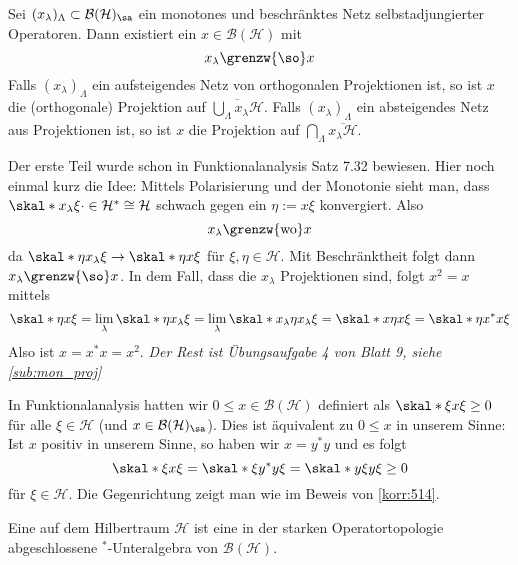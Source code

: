\begin{satz}[label=satz:62,{name=[monotone Netze selbstadjungierter Operatoren]}]
	Sei $(x_\lambda)_\Lambda \subset \mathcal{B}(\mathcal{H})_\sa$ ein monotones und beschränktes Netz selbstadjungierter Operatoren.
	Dann existiert ein $x \in \mathcal{B}(\mathcal{H})$ mit 
	\[
		x_\lambda \grenzw{\so} x
	\]
	Falls $(x_\lambda)_\Lambda$ ein aufsteigendes Netz von orthogonalen Projektionen ist, so ist $x$ die (orthogonale) Projektion auf $\overline{\bigcup_{\Lambda} x_\lambda \mathcal{H}}$.
	Falls $(x_\lambda)_\Lambda$ ein absteigendes Netz aus Projektionen ist, so ist $x$ die Projektion auf $\bigcap_\Lambda\overline{x_\lambda \mathcal{H}}$.
\end{satz}
\begin{beweis}
	Der erste Teil wurde schon in Funktionalanalysis Satz 7.32 bewiesen. 
	Hier noch einmal kurz die Idee: 
	Mittels Polarisierung und der Monotonie sieht man, dass $\skal*{x_\lambda \xi}{\cdot} \in \mathcal{H}^*\cong \mathcal{H}$ schwach gegen ein $\eta:= x \xi$ konvergiert.
	Also
	\[
		x_\lambda \grenzw{\mathrm{wo}} x
	\]
	da $\skal*{\eta}{x_\lambda \xi} \to \skal*{\eta}{x \xi}$ für $\xi,\eta \in \mathcal{H}$. 
	Mit Beschränktheit folgt dann $x_\lambda \grenzw{\so} x$.
	In dem Fall, dass die $x_\lambda$ Projektionen sind, folgt $x^2=x$ mittels 
	\[
		\skal*{\eta}{x \xi} = \lim_\lambda \skal*{\eta}{x_\lambda \xi} = \lim_\lambda \skal*{x_\lambda \eta}{x_\lambda \xi} = \skal*{x \eta}{x \xi} = \skal*{\eta}{x^* x \xi}
	\]
	Also ist $x=x^*x=x^2$. \emph{Der Rest ist Übungsaufgabe 4 von Blatt 9, siehe \cref{sub:mon_proj}}
\end{beweis}

\begin{bemerkung}[{name=[verschiedene Definitionen von Positivität]},label=bem:63]
	In Funktionalanalysis hatten wir $0\le x \in \mathcal{B}(\mathcal{H})$ definiert als $\skal*{\xi}{x \xi} \ge 0$ für alle $\xi \in \mathcal{H}$ (und $x \in \mathcal{B}(\mathcal{H})_\sa$).
	Dies ist äquivalent zu $0\le x$ in unserem Sinne: 
	Ist $x$ positiv in unserem Sinne, so haben wir $x=y^*y$ und es folgt
	\[
		\skal*{\xi}{x \xi} = \skal*{\xi}{y^*y \xi} = \skal*{y \xi}{y \xi} \ge 0
	\]
	für $\xi \in \mathcal{H}$. 
	Die Gegenrichtung zeigt man wie im Beweis von \autoref{korr:514}.
\end{bemerkung}

\begin{definition}[{name=[von-Neumann-Algebra]}]
	Eine  auf dem Hilbertraum $\mathcal{H}$ ist eine in der starken Operatortopologie abgeschlossene $^*$-Unteralgebra von $\mathcal{B}(\mathcal{H})$.
\end{definition}

